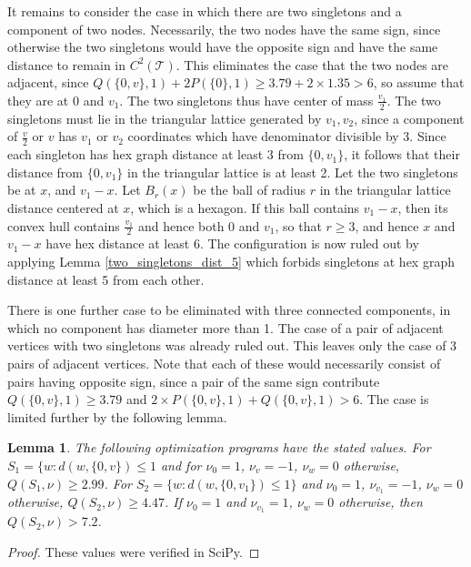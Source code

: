 \documentclass[a4paper, 12pt, notitlepage]{amsart}
\newcommand{\sT}{\mathscr{T}}
\newtheorem{lemma}[theorem]{Lemma}
\theoremstyle{remark}
\begin{document}
 It remains to consider the case in which there are two singletons and a component of two nodes.  Necessarily, the two nodes have the same sign, since otherwise the two singletons would have the opposite sign and have the same distance to remain in $C^2(\sT)$.  This eliminates the case that the two nodes are adjacent, since $Q(\{0,v\}, 1) + 2P(\{0\},1) \geq 3.79 + 2 \times 1.35 > 6$, so assume that they are at 0 and $v_1$.  The two singletons thus have center of mass $\frac{v_1}{2}$.  
 The two singletons must lie in the triangular lattice generated by $v_1, v_2$, since a component of $\frac{v}{2}$ or $v$ has $v_1$ or $v_2$ coordinates which have denominator divisible by 3.  
 Since each singleton has hex graph distance at least 3 from $\{0, v_1\}$, it follows that their distance from $\{0, v_1\}$ in the triangular lattice is at least 2. Let the two singletons be at $x$, and $v_1-x$.  Let $B_r(x)$ be the ball of radius $r$ in the triangular lattice distance centered at $x$, which is a hexagon.  If this ball contains $v_1-x$, then its convex hull contains $\frac{v_1}{2}$ and hence both 0 and $v_1$, so that $r \geq 3$, and hence $x$ and $v_1-x$ have hex distance at least 6.  The configuration is now ruled out by applying  Lemma \ref{two_singletons_dist_5} which forbids singletons at hex graph distance at least 5 from each other. 
 
 There is one further case to be eliminated with three connected components, in which no component has diameter more than 1.  The case of a pair of adjacent vertices with two singletons was already ruled out.  This leaves only the case of 3 pairs of adjacent vertices.  Note that each of these would necessarily consist of pairs having opposite sign, since a pair of the same sign contribute $Q(\{0,v\},1) \geq 3.79$ and $2 \times P(\{0,v\},1) + Q(\{0,v\},1)>6$.  The case is limited further by the following lemma.
 
   \begin{lemma}\label{one_node_expansion_boundary}
  The following optimization programs have the stated values. For $S_1 = \{w : d(w, \{0,v\}) \leq 1$ and for $\nu_0 = 1$, $\nu_v = -1$, $\nu_w = 0$ otherwise, $Q(S_1, \nu) \geq 2.99$.  For $S_2 = \{w : d(w, \{0, v_1\}) \leq 1\}$ and $\nu_0 = 1$, $\nu_{v_1} = -1$, $\nu_w = 0$ otherwise, $Q(S_2, \nu) \geq 4.47$.  If $\nu_0 = 1$ and $\nu_{v_1} = 1$, $\nu_w = 0$ otherwise, then $Q(S_2, \nu) > 7.2$.
 \end{lemma}

 \begin{proof}
  These values were verified in SciPy.
 \end{proof}
 
\end{document}
